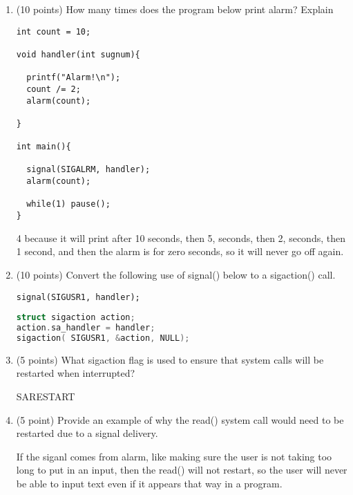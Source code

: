 \documentclass{article}[9pt]
\newenvironment{myanswer}{\begin{mdframed}\begin{answerfont}}{\end{answerfont}\end{mdframed}}
\begin{document}
\begin{enumerate}
\item 
(10 points) How many times does the program below print alarm? Explain



\begin{lstlisting}
int count = 10;

void handler(int sugnum){

  printf("Alarm!\n");
  count /= 2;
  alarm(count);

}

int main(){

  signal(SIGALRM, handler);
  alarm(count);

  while(1) pause();
}

\end{lstlisting}


\begin{myanswer}
4 because it will print after 10 seconds, then 5, seconds, then 2,
seconds, then 1 second, and then the alarm is for zero seconds, so it
will never go off again.
\end{myanswer}

\item 
(10 points) Convert the following use of signal() below to a
sigaction() call.



\begin{lstlisting}
signal(SIGUSR1, handler);

\end{lstlisting}


\begin{myanswer}
\begin{lstlisting}[language=c]
struct sigaction action;
action.sa_handler = handler;
sigaction( SIGUSR1, &action, NULL);
\end{lstlisting}
\end{myanswer}

\item (5 points) What sigaction flag is used to ensure that system
calls will be restarted when interrupted?
\begin{myanswer}
SA\textunderscore RESTART
\end{myanswer}

\item (5 point) Provide an example of why the read() system call
would need to be restarted due to a signal delivery.
\begin{myanswer}
If the siganl comes from alarm, like making sure the user is not taking
too long to put in an input, then the read() will not restart, so the
user will never be able to input text even if it appears that way in a
program.
\end{myanswer}


\end{enumerate}
\end{document}
